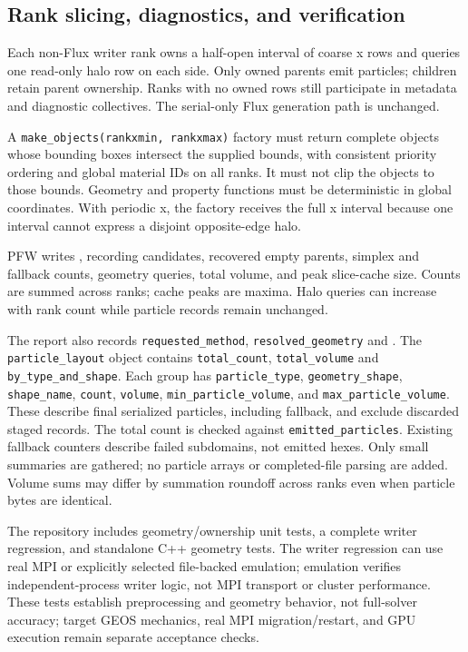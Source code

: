 \subsection{Rank slicing, diagnostics, and verification}
Each non-Flux writer rank owns a half-open interval of coarse x rows and queries one read-only halo row on each side. Only owned parents emit particles; children retain parent ownership. Ranks with no owned rows still participate in metadata and diagnostic collectives. The serial-only Flux generation path is unchanged.

A \texttt{make\_objects(rankxmin, rankxmax)} factory must return complete objects whose bounding boxes intersect the supplied bounds, with consistent priority ordering and global material IDs on all ranks. It must not clip the objects to those bounds. Geometry and property functions must be deterministic in global coordinates. With periodic x, the factory receives the full x interval because one interval cannot express a disjoint opposite-edge halo.

PFW writes , recording candidates, recovered empty parents, simplex and fallback counts, geometry queries, total volume, and peak slice-cache size. Counts are summed across ranks; cache peaks are maxima. Halo queries can increase with rank count while particle records remain unchanged.

The report also records \texttt{requested\_method},
\texttt{resolved\_geometry} and .
The \texttt{particle\_layout} object contains \texttt{total\_count},
\texttt{total\_volume} and \texttt{by\_type\_and\_shape}. Each group has
\texttt{particle\_type}, \texttt{geometry\_shape}, \texttt{shape\_name},
\texttt{count}, \texttt{volume}, \texttt{min\_particle\_volume}, and
\texttt{max\_particle\_volume}. These describe final serialized particles,
including fallback, and exclude discarded staged records. The total count is
checked against \texttt{emitted\_particles}. Existing fallback counters describe
failed subdomains, not emitted hexes. Only small summaries are gathered; no
particle arrays or completed-file parsing are added. Volume sums may differ by
summation roundoff across ranks even when particle bytes are identical.


The repository includes geometry/ownership unit tests, a complete writer regression, and standalone C++ geometry tests. The writer regression can use real MPI or explicitly selected file-backed emulation; emulation verifies independent-process writer logic, not MPI transport or cluster performance. These tests establish preprocessing and geometry behavior, not full-solver accuracy; target GEOS mechanics, real MPI migration/restart, and GPU execution remain separate acceptance checks.
